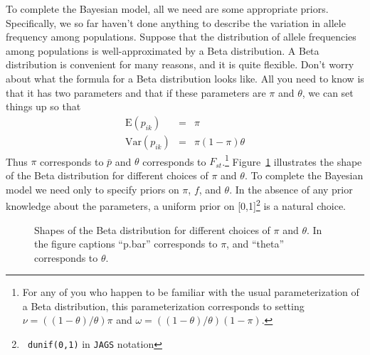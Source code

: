 \documentclass[12pt]{article}
\begin{document}
To complete the Bayesian model, all we need are some appropriate
priors. Specifically, we so far haven't done anything to describe the
variation in allele frequency among populations. Suppose that the
distribution of allele frequencies among populations is
well-approximated by a Beta distribution. A Beta
distribution is convenient for many reasons, and it is quite
flexible. Don't worry about what the formula for a Beta distribution
looks like. All you need to know is that it has two parameters and
that if these parameters are $\pi$ and $\theta$, we can set things up
so that
\begin{eqnarray*}
\mbox{E}(p_{ik}) &=& \pi \\
\mbox{Var}(p_{ik}) &=& \pi(1-\pi)\theta
\end{eqnarray*}
Thus $\pi$ corresponds to $\bar p$ and $\theta$ corresponds to
$F_{st}$.\footnote{For any of you who happen to be familiar with the
usual parameterization of a Beta distribution, this parameterization
corresponds to setting $\nu = ((1-\theta)/\theta)\pi$ and $\omega =
((1-\theta)/\theta)(1-\pi)$.} Figure~\ref{fig:beta} illustrates the
shape of the Beta distribution for different choices of $\pi$ and
$\theta$. To complete the Bayesian model we need only to specify
priors on $\pi$, $f$, and $\theta$. In the absence of any prior
knowledge about the parameters, a uniform prior on [0,1]\footnote{{\tt
dunif(0,1)} in {\tt JAGS} notation} is a natural choice.
\begin{figure}
\caption{Shapes of the Beta distribution for different choices of
  $\pi$ and $\theta$. In the figure captions ``p.bar'' corresponds to $\pi$,
  and ``theta'' corresponds to $\theta$.}\label{fig:beta}
\end{figure}
\end{document}
